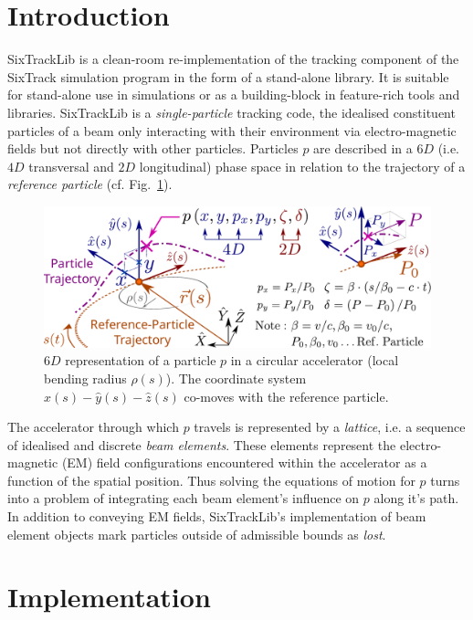 \documentclass[a4paper,
               refpage,       %
               keeplastbox,   %
               ]{jacow}
\begin{document}
\section{Introduction}
SixTrackLib\cite{sixtracklib-repo-2021} is a clean-room re-implementation of the tracking component of the SixTrack\cite{demaria2019,sixtrack-repo-2021} simulation program in the form of a stand-alone library. It is suitable for stand-alone use in simulations or as a building-block in feature-rich tools and libraries. SixTrackLib is a \textit{single-particle} tracking code, the idealised constituent particles of a beam only interacting with their environment via electro-magnetic fields but not directly with other particles. Particles $p$ are described in a $6D$ (i.e. $4D$ transversal and $2D$ longitudinal) phase space in relation to the trajectory of a \textit{reference particle} (cf. Fig.~\ref{fig:coordinates}).
\begin{figure}[!htb]
   \centering
   \includegraphics*[width=.9\columnwidth]{THPAB190_f1}
   \caption{$6D$ representation of a particle $p$ in a circular accelerator (local bending radius $\rho(s)$). The coordinate system $\hat{x}(s)-\hat{y}(s)-\hat{z}(s)$ co-moves with the reference particle.}
   \label{fig:coordinates}
\end{figure}
The accelerator through which $p$ travels is represented by a \textit{lattice}, i.e. a sequence of idealised and discrete \textit{beam elements}. These elements represent the electro-magnetic (EM) field configurations encountered within the accelerator as a function of the spatial position. Thus solving the equations of motion for $p$ turns into a problem of integrating each beam element's influence on $p$ along it's path. In addition to conveying EM fields, SixTrackLib's implementation of beam element objects mark particles outside of admissible bounds as \textit{lost}.

\section{Implementation}
\end{document}
